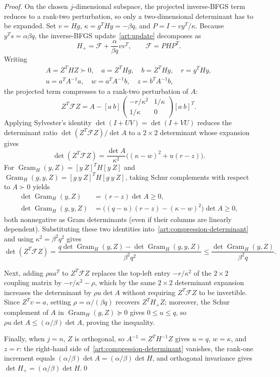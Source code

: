\begin{proof}
On the chosen $j$-dimensional subspace, the projected inverse-BFGS term reduces
to a rank-two perturbation, so only a two-dimensional determinant has to be
expanded. Set $v=Hg$, $\kappa=g^THy=-\beta q$, and $P=I-vy^T/\kappa$. Because
$y^Ts=\alpha\beta q$, the inverse-BFGS update~\eqref{art:update} decomposes as
\[
 H_+=\mathcal F+\frac{\alpha}{\beta q}vv^T,
 \qquad \mathcal F=PHP^T.
\]
Writing
\[
 \begin{gathered}
 A=Z^THZ\succ0,\quad a=Z^THg,\quad b=Z^THy,\quad r=y^THy,\\
 u=a^TA^{-1}a,\quad w=a^TA^{-1}b,\quad z=b^TA^{-1}b,
 \end{gathered}
\]
the projected term compresses to a rank-two perturbation of $A$:
\[
 Z^T\mathcal FZ
 =A-[a\ b]
 \begin{pmatrix}-r/\kappa^2&1/\kappa\\1/\kappa&0\end{pmatrix}
 [a\ b]^T.
\]
Applying Sylvester's identity $\det(I+UV)=\det(I+VU)$ reduces the determinant
ratio $\det(Z^T\mathcal FZ)/\det A$ to a $2\times2$ determinant whose expansion
gives
\begin{equation}\label{art:compression-determinant}
 \det(Z^T\mathcal FZ)
 =\frac{\det A}{\kappa^2}
       \bigl((\kappa-w)^2+u(r-z)\bigr).
\end{equation}
For $\operatorname{Gram}_H(y,Z)=[y\ Z]^TH[y\ Z]$ and
$\operatorname{Gram}_H(g,y,Z)=[g\ y\ Z]^TH[g\ y\ Z]$, taking Schur complements
with respect to $A\succ0$ yields
\begin{align*}
 \det\operatorname{Gram}_H(y,Z)&=(r-z)\det A\ge0,\\
 \det\operatorname{Gram}_H(g,y,Z)
 &=\bigl((q-u)(r-z)-(\kappa-w)^2\bigr)\det A\ge0,
\end{align*}
both nonnegative as Gram determinants (even if their columns are linearly
dependent). Substituting these two identities into~\eqref{art:compression-determinant}
and using $\kappa^2=\beta^2q^2$ gives
\[
 \det(Z^T\mathcal FZ)
 =\frac{q\det\operatorname{Gram}_H(y,Z)
             -\det\operatorname{Gram}_H(g,y,Z)}{\beta^2q^2}
 \le\frac{\det\operatorname{Gram}_H(y,Z)}{\beta^2q}.
\]

Next, adding $\rho aa^T$ to $Z^T\mathcal FZ$ replaces the top-left entry
$-r/\kappa^2$ of the $2\times2$ coupling matrix by $-r/\kappa^2-\rho$, which by
the same $2\times2$ determinant expansion increases the determinant by
$\rho u\det A$ without requiring $Z^T\mathcal FZ$ to be invertible. Since
$Z^Tv=a$, setting $\rho=\alpha/(\beta q)$ recovers $Z^TH_+Z$; moreover, the
Schur complement of $A$ in $\operatorname{Gram}_H(g,Z)\succeq0$ gives $0\le u\le q$,
so $\rho u\det A\le(\alpha/\beta)\det A$, proving the inequality.

Finally, when $j=n$, $Z$ is orthogonal, so $A^{-1}=Z^TH^{-1}Z$ gives $u=q$,
$w=\kappa$, and $z=r$: the right-hand side of~\eqref{art:compression-determinant}
vanishes, the rank-one increment equals $(\alpha/\beta)\det A=(\alpha/\beta)\det H$,
and orthogonal invariance gives $\det H_+=(\alpha/\beta)\det H$.\qed
\end{proof}
